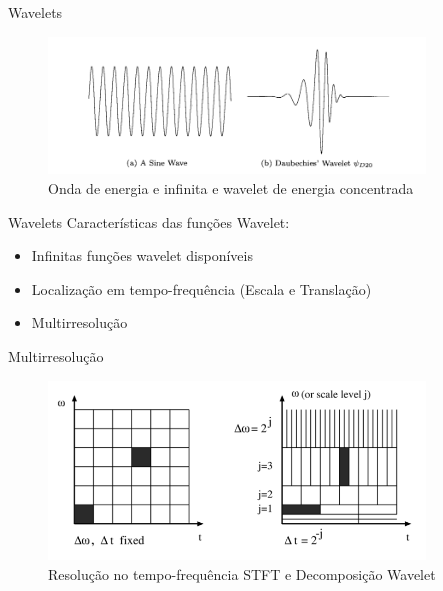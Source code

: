 \documentclass[10pt]{beamer}
\begin{document}
\begin{frame} {Wavelets}
  \begin{figure}[]
    \centering
    \includegraphics[width=10cm]{images/waveAndWavelet.png}
    \caption{Onda de energia e infinita e wavelet de energia concentrada}
  \end{figure}
\end{frame}

\begin{frame} {Wavelets}
  Características das funções Wavelet:
  \begin{itemize}
    \item Infinitas funções wavelet disponíveis
    \item Localização em tempo-frequência (Escala e Translação)
    \item Multirresolução
  \end{itemize}
\end{frame}


\begin{frame}{Multirresolução}

  \begin{figure}[]
    \centering
    \includegraphics[width=10cm]{images/multiresolution.png}
    \caption{Resolução no tempo-frequência STFT e Decomposição Wavelet}
  \end{figure}

\end{frame}
\end{document}
